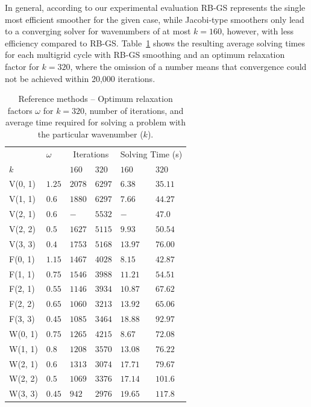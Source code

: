In general, according to our experimental evaluation RB-GS represents the single most efficient smoother for the given case, while Jacobi-type smoothers only lead to a converging solver for wavenumbers of at most $k = 160$, however, with less efficiency compared to RB-GS.
Table~\ref{table:reference-methods-helmholtz} shows the resulting average solving times for each multigrid cycle with RB-GS smoothing and an optimum relaxation factor for $k = 320$, where the omission of a number means that convergence could not be achieved within 20,000 iterations. 
\begin{table}
	\caption{Reference methods -- Optimum relaxation factors $\omega$ for $k = 320$, number of iterations, and average time required for solving a problem with the particular wavenumber ($k$).}
	\label{table:reference-methods-helmholtz}
	\centering
	\begin{tabular}{l l l l l l}
		\toprule
		& $\omega$ & \multicolumn{2}{c}{Iterations} & \multicolumn{2}{c}{Solving Time (s)} \\
		\cmidrule(r){3-4} \cmidrule(r){5-6}
		$k$ & & $160$ & $320$ & $160$ & $320$ \\
		\midrule
		V(0, 1) & $1.25$ & $2078$ & $6297$ & $6.38$ & $35.11$ \\
		\midrule
		V(1, 1) & $0.6$ & $1880$ & $6297$ & $7.66$ & $44.27$ \\
		\midrule
		V(2, 1) & $0.6$ & $-$ & $5532$ & $-$ & $47.0$ \\
		\midrule
		V(2, 2) & $0.5$ & $1627$ & $5115$ & $9.93$ & $50.54$  \\
		\midrule
		V(3, 3) & $0.4$ & $1753$ & $5168$ & $13.97$ & $76.00$ \\
		\midrule
		F(0, 1) & $1.15$ & $1467$ & $4028$ & $8.15$ & $42.87$  \\
		\midrule
		F(1, 1) & $0.75$ & $1546$ & $3988$ & $11.21$ & $54.51$ \\
		\midrule
		F(2, 1) & $0.55$ & $1146$ & $3934$ & $10.87$ & $67.62$ \\
		\midrule
		F(2, 2) & $0.65$ & $1060$ & $3213$ & $13.92$ & $65.06$ \\
		\midrule
		F(3, 3) & $0.45$ & $1085$ & $3464$ & $18.88$ & $92.97$ \\
		\midrule
		W(0, 1) & $0.75$ & $1265$ & $4215$ & $8.67$ & $72.08$ \\
		\midrule
		W(1, 1) & $0.8$ & $1208$ & $3570$ & $13.08$ & $76.22$ \\
		\midrule
		W(2, 1) & $0.6$ & $1313$ & $3074$ & $17.71$ & $79.67$ \\
		\midrule
		W(2, 2) & $0.5$ & $1069$ & $3376$ & $17.14$ & $101.6$ \\
		\midrule
		W(3, 3) & $0.45$ & $942$ & $2976$ & $19.65$ & $117.8$ \\
		\bottomrule
	\end{tabular}
\end{table}
